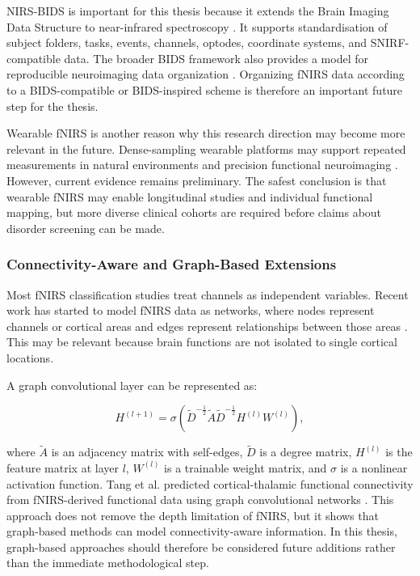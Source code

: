 NIRS-BIDS is important for this thesis because it extends the Brain Imaging Data Structure to
near-infrared spectroscopy \cite{Luke2025}. It supports standardisation of subject folders, tasks,
events, channels, optodes, coordinate systems, and SNIRF-compatible data. The broader BIDS framework
also provides a model for reproducible neuroimaging data organization \cite{Poldrack2024}.
Organizing fNIRS data according to a BIDS-compatible or BIDS-inspired scheme is therefore an
important future step for the thesis.

Wearable fNIRS is another reason why this research direction may become more relevant in the future.
Dense-sampling wearable platforms may support repeated measurements in natural environments and
precision functional neuroimaging \cite{RahimpourJounghani2025}. However, current evidence remains
preliminary. The safest conclusion is that wearable fNIRS may enable longitudinal studies and
individual functional mapping, but more diverse clinical cohorts are required before claims about
disorder screening can be made.

\subsubsection{Connectivity-Aware and Graph-Based Extensions}

Most fNIRS classification studies treat channels as independent variables. Recent work has started
to model fNIRS data as networks, where nodes represent channels or cortical areas and edges
represent relationships between those areas \cite{Tang2024}. This may be relevant because brain
functions are not isolated to single cortical locations.

A graph convolutional layer can be represented as:

\begin{equation}
H^{(l+1)}
=
\sigma
\left(
\tilde{D}^{-\frac{1}{2}}
\tilde{A}
\tilde{D}^{-\frac{1}{2}}
H^{(l)}
W^{(l)}
\right),
\end{equation}

where \(\tilde{A}\) is an adjacency matrix with self-edges, \(\tilde{D}\) is a degree matrix,
\(H^{(l)}\) is the feature matrix at layer \(l\), \(W^{(l)}\) is a trainable weight matrix, and
\(\sigma\) is a nonlinear activation function. Tang et al. predicted cortical-thalamic functional
connectivity from fNIRS-derived functional data using graph convolutional networks \cite{Tang2024}.
This approach does not remove the depth limitation of fNIRS, but it shows that graph-based methods
can model connectivity-aware information. In this thesis, graph-based approaches should therefore be
considered future additions rather than the immediate methodological step.

